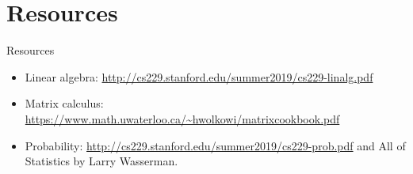 \documentclass[10pt]{beamer}
\begin{document}
\section{Resources}
\begin{frame}{Resources}
\begin{itemize}
    \item Linear algebra: \url{http://cs229.stanford.edu/summer2019/cs229-linalg.pdf}
    \item Matrix calculus: \url{https://www.math.uwaterloo.ca/~hwolkowi/matrixcookbook.pdf}
    \item Probability: \url{http://cs229.stanford.edu/summer2019/cs229-prob.pdf} and All of Statistics by Larry Wasserman. 
\end{itemize}
\end{frame}
\end{document}
